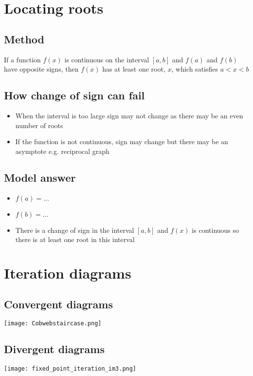 \section{Locating roots}
\subsection{Method}
If a function $f(x)$ is continuous on the interval $[a,b]$ and $f(a)$ and $f(b)$ have opposite signs, then $f(x)$ has at least one root, $x$, which satisfies $a<x<b$
\subsection{How change of sign can fail}
\begin{itemize}
    \item When the interval is too large sign may not change as there may be an even number of roots
    \item If the function is not continuous, sign may change but there may be an asymptote e.g. reciprocal graph
\end{itemize}

\subsection{Model answer}
\begin{itemize}
    \item $f\left( a \right) = \dots$
    \item $f\left( b \right) = \dots$
    \item There is a change of sign in the interval $[a, b]$ and $f\left( x \right)$ is continuous so there is at least one root in this interval
\end{itemize}

\section{Iteration diagrams}
\subsection{Convergent diagrams}
\texttt{[image: Cobwebstaircase.png]}
\subsection{Divergent diagrams}
\texttt{[image: fixed\_point\_iteration\_im3.png]}